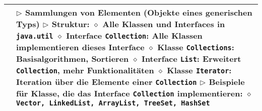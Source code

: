 	\begin{longtable}{ | p{} p{} | }
	\hline
	
	\makecell[l]{Informationen } & \makecell[l]{
	$\triangleright$ Sammlungen von Elementen (Objekte eines generischen Typs) \\
	$\triangleright$ Struktur: \\
	\hspace{0.4cm} $\diamond$ Alle Klassen und Interfaces in \texttt{java.util} \\
	\hspace{0.4cm} $\diamond$ Interface \texttt{Collection}: Alle Klassen implementieren dieses Interface \\
	\hspace{0.4cm} $\diamond$ Klasse \texttt{Collections}: Basisalgorithmen, Sortieren \\
	\hspace{0.4cm} $\diamond$ Interface \texttt{List}: Erweitert \texttt{Collection}, mehr Funktionalitäten \\
	\hspace{0.4cm} $\diamond$ Klasse \texttt{Iterator}: Iteration über die Elemente einer \texttt{Collection} \\
	$\triangleright$ Beispiele für Klasse, die das Interface \texttt{Collection} implementieren: \\
	\hspace{0.4cm} $\diamond$ \texttt{Vector, LinkedList, ArrayList, TreeSet, HashSet} } \\ \hline
	

\end{longtable}
